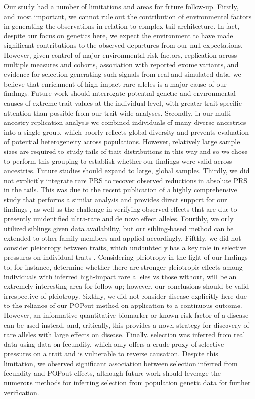 \documentclass[12pt]{zHenriquesLab-StyleBioRxiv}
\begin{document}
Our study had a number of limitations and areas for future follow-up. 
Firstly, and most important, we cannot rule out the contribution of 
environmental factors in generating the observations in relation to 
complex tail architecture. In fact, despite our focus on genetics 
here, we expect the environment to have made significant contributions 
to the observed departures from our null expectations. However, 
given control of major environmental risk factors, replication across 
multiple measures and cohorts, association with reported exome variants, 
and evidence for selection generating such signals from real and simulated data, 
we believe that enrichment of high-impact rare alleles is a major cause of our findings. 
Future work should interrogate potential genetic and environmental causes of extreme 
trait values at the individual level, with greater trait-specific attention than possible 
from our trait-wide analyses. Secondly, in our multi-ancestry replication analysis we 
combined individuals of many diverse ancestries into a single group, which poorly 
reflects global diversity and prevents evaluation of potential heterogeneity across 
populations. However, relatively large sample sizes are required to study tails of trait distributions in this 
way and so we chose to perform this grouping to establish whether our 
findings were valid across ancestries. Future studies should expand to large, 
global samples. Thirdly, we did not explicitly integrate rare PRS to recover observed reductions 
in absolute PRS in the tails. This was due to the recent publication of a highly comprehensive 
study that performs a similar analysis and provides direct support for our findings \cite{Fiziev2023}, 
as well as the challenge in verifying observed effects that are due to 
presently unidentified ultra-rare and  de novo effect alleles. 
Fourthly, we only utilized siblings given data availability, but our
sibling-based method can be extended to other family members \cite{Souaiaia2024}
and applied accordingly. Fifthly, we did not consider pleiotropy between 
traits, which undoubtedly has a key role in selective pressures on individual traits \cite{Barghi2020}. 
Considering pleiotropy in the light of our findings to, for instance, determine 
whether there are stronger pleiotropic effects among individuals with 
inferred high-impact rare alleles vs those without, will be an extremely 
interesting area for follow-up; however, our conclusions should be valid 
irrespective of pleiotropy. Sixthly, we did not consider disease explicitly 
here due to the reliance of our POPout method on application to a continuous outcome. 
However, an informative quantitative biomarker or known risk factor of a 
disease can be used instead, and, critically, this provides a novel strategy 
for discovery of rare alleles with large effects on disease. 
Finally, selection was inferred from real data using data on fecundity, 
which only offers a crude proxy of selective pressures on a trait and 
is vulnerable to reverse causation. Despite this limitation, 
we observed significant association between selection inferred 
from fecundity and POPout effects, although future work should leverage 
the numerous methods for inferring selection from population genetic data for further verification. 
\end{document}
